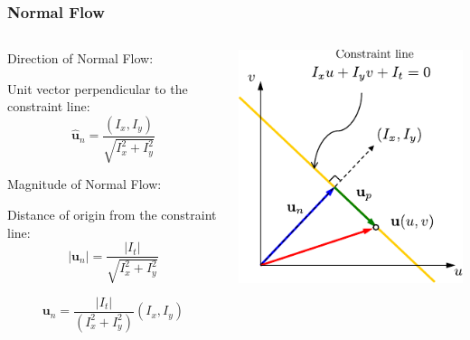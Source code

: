 \begin{frame}
  \frametitle{Normal Flow}

  \begin{columns}
    \begin{column}{0.6\textwidth}  %
      Direction of Normal Flow:

      Unit vector perpendicular to the constraint line:
      \[
      \hat{\mathbf{u}}_n = \frac{(I_x, I_y)}{\sqrt{I_x^2 + I_y^2}}
      \]

      Magnitude of Normal Flow:

      Distance of origin from the constraint line:
      \[
      |\mathbf{u}_n| = \frac{|I_t|}{\sqrt{I_x^2 + I_y^2}}
      \]

      \[
      \boxed{\mathbf{u}_n = \frac{|I_t|}{(I_x^2 + I_y^2)} (I_x, I_y)}
      \]
    \end{column}
    \begin{column}{0.4\textwidth}
      \begin{center}
        \includegraphics[width=\columnwidth]{./images/optical_flow/optical_flow_geometric_interpretation.pdf}
      \end{center}
    \end{column}
  \end{columns}

\end{frame}

